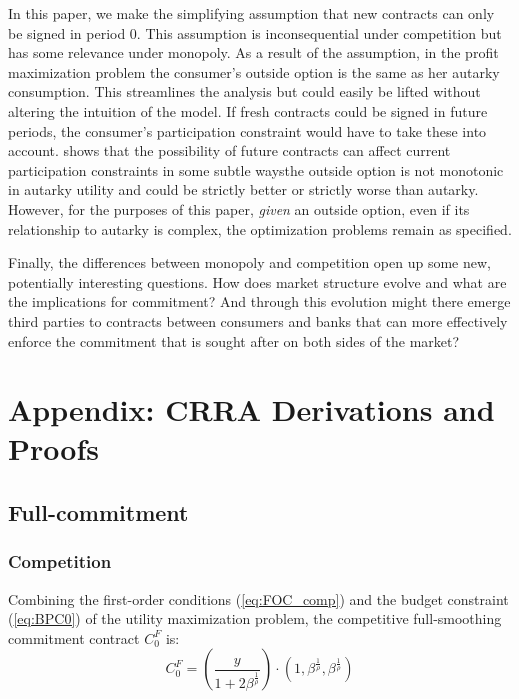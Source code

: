 \documentclass[11pt,english]{article}
\theoremstyle{plain}
\theoremstyle{definition}
\begin{document}
In this paper, we make the simplifying assumption that new contracts
can only be signed in period 0. This assumption is inconsequential
under competition but has some relevance under monopoly. As a result of the assumption,
in the profit maximization problem the consumer\textquoteright s outside
option is the same as her autarky consumption. This streamlines the
analysis but could easily be lifted without altering the intuition
of the model. If fresh contracts could be signed in future periods,
the consumer\textquoteright s participation constraint would have
to take these into account. \citet{basu2020} shows that the possibility
of future contracts can affect current participation constraints in
some subtle ways\textemdash the outside option is not monotonic in
autarky utility and could be strictly better or strictly worse than
autarky. However, for the purposes of this paper, \emph{given} an outside
option, even if its relationship to autarky is complex, the optimization
problems remain as specified.

Finally, the differences between monopoly and competition open up
some new, potentially interesting questions. How does market structure
evolve and what are the implications for commitment? And through this
evolution might there emerge third parties to contracts between consumers
and banks that can more effectively enforce the commitment that is
sought after on both sides of the market?

\appendix

\section{Appendix: CRRA Derivations and Proofs}

\subsection{Full-commitment}

\subsubsection{Competition}

Combining the first-order conditions (\ref{eq:FOC_comp}) and the
budget constraint (\ref{eq:BPC0}) of the utility maximization problem,
the competitive full-smoothing commitment contract $C_{0}^{F}$ is:
\begin{equation}
C_{0}^{F}=\left(\frac{y}{1+2\beta^{\frac{1}{\rho}}}\right)\cdot\left(1,\beta^{\frac{1}{\rho}},\beta^{\frac{1}{\rho}}\right)\label{eq:c-f}
\end{equation}
\end{document}
